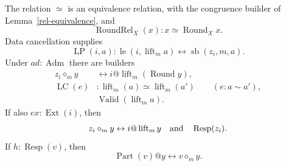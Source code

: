 \begin{lemma}
\label{rel-lift-properties}
The relation \(\simeq\) is an equivalence relation, with the
congruence builder of Lemma~\ref{rel-equivalence}, and
\[
 \operatorname{RoundRel}_X(x):x\simeq\operatorname{Round}_Xx.
\]
Data cancellation supplies
\[
 \operatorname{LP}(i,a):
       \operatorname{le}(i,\operatorname{lift}_m a)\leftrightarrow \operatorname{sb}(z_i,m,a).
\]
Under \(ad:\operatorname{Adm}\) there are builders
\begin{align}
 z_i\diamond_m y&\leftrightarrow
             i@\operatorname{lift}_m(\operatorname{Round}y),
                  \label{rel-probe-rounded}\\
 \operatorname{LC}(e)&:
       \operatorname{lift}_m(a)\simeq\operatorname{lift}_m(a')
                    \qquad(e:a\sim a'), \label{rel-lift-congruence}\\
 &\operatorname{Valid}(\operatorname{lift}_m a). \label{rel-lift-valid}
\end{align}
If also \(ex:\operatorname{Ext}(i)\), then
\begin{equation}
 z_i\diamond_m y\leftrightarrow i@\operatorname{lift}_m y
 \quad\hbox{and}\quad \operatorname{Resp}(z_i).
 \label{rel-probe-exact}
\end{equation}
If \(h:\operatorname{Resp}(v)\), then
\begin{equation}
 \operatorname{Part}(v)@y\leftrightarrow v\diamond_m y.
 \label{rel-part-exact}
\end{equation}
\end{lemma}
